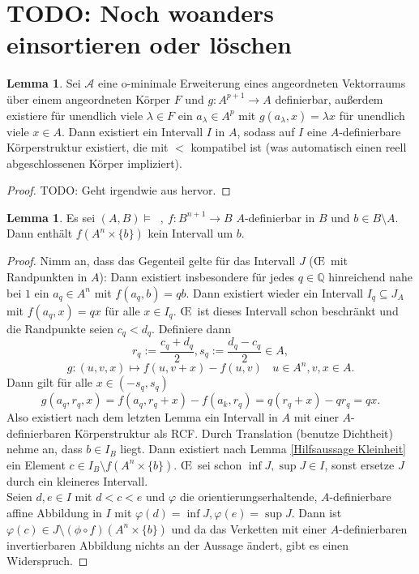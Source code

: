 \documentclass[a4paper, 11pt]{report}
\newcommand{\fA}{\mathcal{A}}
\newcommand{\setQ}{\mathbb{Q}}
\DeclareMathOperator{\td}{T^d}
\theoremstyle{definition}
\newtheorem{lemma}[subsection]{Lemma}
\begin{document}
\section{TODO: Noch woanders einsortieren oder löschen}

\begin{lemma}
	Sei $\fA$ eine o-minimale Erweiterung eines angeordneten Vektorraums über einem angeordneten Körper $F$ und $g:A^{p+1}\rightarrow A$ definierbar, außerdem existiere für unendlich viele $\lambda\in F$ ein $a_\lambda\in A^p$ mit $g(a_\lambda,x)=\lambda x$ für unendlich viele $x\in A$. Dann existiert ein Intervall $I$ in $A$, sodass auf $I$ eine $A$-definierbare Körperstruktur existiert, die mit $<$ kompatibel ist (was automatisch einen reell abgeschlossenen Körper impliziert).
\end{lemma}
\begin{proof}
	TODO: Geht irgendwie aus \cite{PeterStarch} hervor.
\end{proof}

\begin{lemma}
	Es sei $(A,B)\models\td,\ f:B^{n+1}\rightarrow B$ $A$-definierbar in $B$ und $b\in B\setminus A$. Dann enthält $f(A^n\times\{b\})$ kein Intervall um $b$.
\end{lemma}
\begin{proof}
	Nimm an, dass das Gegenteil gelte für das Intervall $J$ (\OE\ mit Randpunkten in $A$): Dann existiert insbesondere für jedes $q\in\setQ$ hinreichend nahe bei $1$ ein $a_q\in A^n$ mit $f(a_q,b)=qb$. Dann existiert wieder ein Intervall $I_q\subseteq J_A$ mit $f(a_q,x)=qx$ für alle $x\in I_q$. \OE\ ist dieses Intervall schon beschränkt und die Randpunkte seien $c_q<d_q$. Definiere dann $$r_q:=\frac{c_q+d_q}{2},s_q:=\frac{d_q-c_q}{2}\in A,$$ $$g:(u,v,x)\mapsto f(u,v+x)-f(u,v)\ \ \ \ u\in A^n,v,x\in A.$$
	Dann gilt für alle $x\in(-s_q,s_q)$ $$g(a_q,r_q,x)=f(a_q,r_q+x)-f(a_k,r_q)=q(r_q+x)-qr_q=qx.$$
	Also existiert nach dem letzten Lemma ein Intervall in $A$ mit einer $A$-definierbaren Körperstruktur als RCF. Durch Translation (benutze Dichtheit) nehme an, dass $b\in I_B$ liegt. Dann existiert nach Lemma \ref{Hilfsaussage Kleinheit} ein Element $c\in I_B\setminus f(A^n\times\{b\})$. \OE\ sei schon $\inf J,\sup J\in I$, sonst ersetze $J$ durch ein kleineres Intervall.\\
	Seien $d,e\in I$ mit $d<c<e$ und $\varphi$ die orientierungserhaltende, $A$-definierbare affine Abbildung in $I$ mit $\varphi(d)=\inf J,\varphi(e)=\sup J$. Dann ist $\varphi(c)\in J\setminus(\phi\circ f)(A^n\times\{b\})$ und da das Verketten mit einer $A$-definierbaren invertierbaren Abbildung nichts an der Aussage ändert, gibt es einen Widerspruch.
\end{proof}
\end{document}
